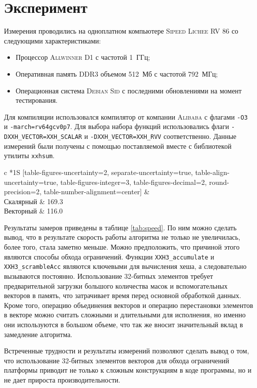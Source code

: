 
\section{Эксперимент}

Измерения проводились на одноплатном компьютере \textsc{Sipeed Lichee RV 86} со следующими характеристиками:
\begin{itemize}
	\item Процессор \textsc{Allwinner D1} с частотой 1~ГГц;
	\item Оперативная память \textsc{DDR3} объемом 512~Мб с частотой 792~МГц;
	\item Операционная система \textsc{Debian Sid} с последними обновлениями на момент тестирования.
\end{itemize}

Для компиляции использовался компилятор от компании \textsc{Alibaba} с флагами \texttt{-O3} и \texttt{-march=rv64gcv0p7}.
Для выбора набора функций использовались флаги \texttt{-DXXH\_VECTOR=XXH\_SCALAR} и \texttt{-DXXH\_VECTOR=XXH\_RVV} соответственно.
Данные измерений были получены с помощью поставляемой вместе с библиотекой утилиты \texttt{xxhsum}.

\begin{table}[h]
	\def\arraystretch{1.1}  %
	\setlength\tabcolsep{0.2em}
	\centering
	\caption{Сравнение производительности хеш-функции  на входных данных размером в 1000~Кб}
	\begin{tabular}[C]{
			c
			*1{S
						[table-figures-uncertainty=2, separate-uncertainty=true, table-align-uncertainty=true,
							table-figures-integer=3, table-figures-decimal=2, round-precision=2,
							table-number-alignment=center]
				}
		}
		\toprule
		 &  \\ \midrule
		Скалярный & 169.3 \\ \midrule
		Векторный & 116.0 \\
		\bottomrule
	\end{tabular}
	\label{tab:speed}
\end{table}

Результаты замеров приведены в таблице \ref{tab:speed}.
По ним можно сделать вывод, что в результате скорость работы алгоритма не только не увеличилась, более того, стала заметно меньше.
Можно предположить, что причиной этого являются способы обхода ограничений.
Функции \texttt{XXH3\_accumulate} и \texttt{XXH3\_scrambleAcc} являются ключевыми для вычисления хеша, а следовательно вызываются постоянно.
Использование 32-битных элементов требует предварительной загрузки большого количества масок и вспомогательных векторов в память, что затрачивает время перед основной обработкой данных.
Кроме того, операцию объединения векторов и операцию перестановки элементов в векторе можно считать сложными и длительными для исполнения, но именно они используются в большом объеме, что так же вносит значительный вклад в замедление алгоритма.

Встреченные трудности и результаты измерений позволяют сделать вывод о том, что использование 32-битных элементов векторов для обхода ограничений платформы приводит не только к сложным конструкциям в коде программы, но и не дает прироста производительности.
